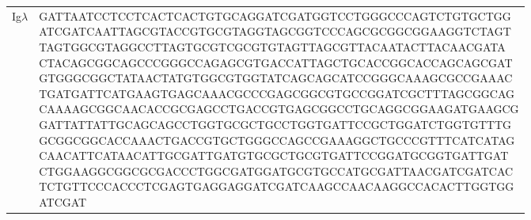 \documentclass{article}%
\begin{document}
\begin{longtable}{p{.5cm}l}
\midrule
Ig$\lambda$ &                                                                                                                           \makecell[l]{GATTAATCCTCCTCACTCACTGTGCAGGATCGATGGTCCTGGGCCCAGTCTGTGCTGG \\ ATCGATCAATTAGCGTACCGTGCGTAGGTAGCGGTCCCAGCGCGGCGGAAGGTCTAGT \\ TAGTGGCGTAGGCCTTAGTGCGTCGCGTGTAGTTAGCGTTACAATACTTACAACGATA \\ CTACAGCGGCAGCCCGGGCCAGAGCGTGACCATTAGCTGCACCGGCACCAGCAGCGAT \\ GTGGGCGGCTATAACTATGTGGCGTGGTATCAGCAGCATCCGGGCAAAGCGCCGAAAC \\ TGATGATTCATGAAGTGAGCAAACGCCCGAGCGGCGTGCCGGATCGCTTTAGCGGCAG \\ CAAAAGCGGCAACACCGCGAGCCTGACCGTGAGCGGCCTGCAGGCGGAAGATGAAGCG \\ GATTATTATTGCAGCAGCCTGGTGCGCTGCCTGGTGATTCCGCTGGATCTGGTGTTTG \\ GCGGCGGCACCAAACTGACCGTGCTGGGCCAGCCGAAAGGCTGCCCGTTTCATCATAG \\ CAACATTCATAACATTGCGATTGATGTGCGCTGCGTGATTCCGGATGCGGTGATTGAT \\ CTGGAAGGCGGCGCGACCCTGGCGATGGATGCGTGCCATGCGATTAACGATCGATCAC \\ TCTGTTCCCACCCTCGAGTGAGGAGGATCGATCAAGCCAACAAGGCCACACTTGGTGG \\ ATCGAT} \\
\end{longtable}%
%
\end{document}
